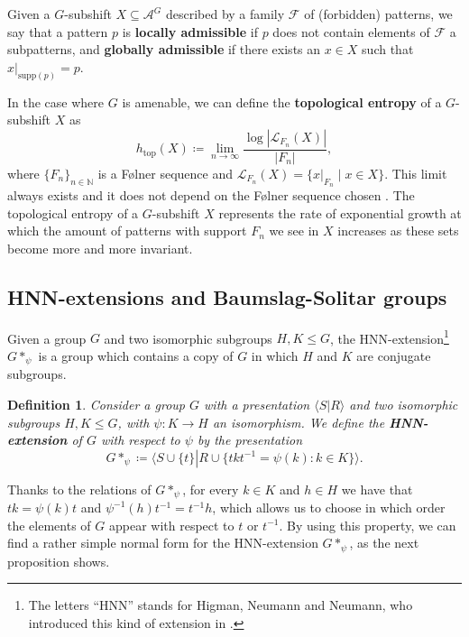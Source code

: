 \documentclass[letterpaper,10pt]{amsart}
\theoremstyle{plain}
\newtheorem{definition}{Definition}[section]
\def\htop{h_{\mathrm{top}}}
\begin{document}
	
	Given a $G$-subshift $X\subseteq \mathcal{A}^G$ described by a family $\mathcal{F}$ of (forbidden) patterns, we say that a pattern $p$ is \textbf{locally admissible} if $p$ does not contain elements of $\mathcal{F}$ a subpatterns, and \textbf{globally admissible} if there exists an $x\in X$ such that $x|_{\mathrm{supp}(p)}=p$.
	
	
	In the case where $G$ is amenable, we can define the \textbf{topological entropy} of a $G$-subshift $X$ as
	$$
	\htop(X)\coloneqq \lim_{n\to \infty}\frac{\log|\mathcal{L}_{F_n}(X)|}{|F_n|},
	$$
	where $\{F_n\}_{n\in \mathbb{N}}$ is a F\o lner sequence and $\mathcal{L}_{F_n}(X)=\{x|_{F_n}\mid x\in X\}$. This limit always exists and it does not depend on the F\o lner sequence chosen \cite[Theorem~4.38]{Kerr2016}. The topological entropy of a $G$-subshift $X$ represents the rate of exponential growth at which the amount of patterns with support $F_n$ we see in $X$ increases as these sets become more and more invariant.


	  \subsection{HNN-extensions and Baumslag-Solitar groups}
Given a group $G$ and two isomorphic subgroups $H,K\le G$, the HNN-extension\footnote{The letters ``HNN'' stands for Higman, Neumann and Neumann, who introduced this kind of extension in \cite{HNN49}.} $G*_{\psi}$ is a group which contains a copy of $G$ in which $H$ and $K$ are conjugate subgroups.

\begin{definition}\label{definition.hnn_extension} Consider a group $G$ with a presentation $\langle S\left|\right. R\rangle$ and two isomorphic subgroups $H,K\le G$, with $\psi:K\to H$ an isomorphism. We define the \textbf{HNN-extension} of $G$ with respect to $\psi$ by the presentation
	$$
	G*_{\psi}\coloneqq \langle S\cup\{t\} \left|\right. R\cup \{t k t^{-1}=\psi(k): k\in K \} \rangle.
	$$
\end{definition}
Thanks to the relations of $G*_{\psi}$, for every $k\in K$ and $h\in H$ we have that $tk=\psi(k)t$ and $\psi^{-1}(h)t^{-1}=t^{-1}h$, which allows us to choose in which order the elements of $G$ appear with respect to $t$ or $t^{-1}$. By using this property, we can find a rather simple normal form for the HNN-extension $G*_{\psi}$, as the next proposition shows.
\end{document}
